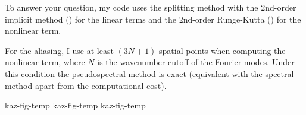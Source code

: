 \begin{description}
To answer your question, my code uses the splitting method with the 
2nd-order implicit method 
() 
for the linear terms and the 2nd-order Runge-Kutta 
() 
for the nonlinear term.

For the aliasing, I use at least $(3N+1)$ spatial points when computing 
the nonlinear term, where $N$ is the wavenumber cutoff of the Fourier modes. 
Under this condition the pseudospectral method is exact 
(equivalent with the spectral method apart from the computational cost).
 
{kaz-fig-temp}   %
{}   %
{    %
kaz-fig-temp
}
{kaz-fig-temp}   %


\end{description}
